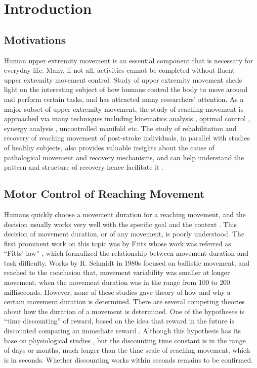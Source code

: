\chapter{Introduction}
\raggedbottom
\label{cha:introduction}


\section{Motivations}
\label{sec:motivations}
Human upper extremity movement is an essential component that is necessary for everyday life.
Many, if not all, activities cannot be completed without fluent upper extremity movement control.
Study of upper extremity movement sheds light on the interesting subject of how humans control the body to move around and perform certain tasks, and has attracted many researchers’ attention. 
As a major subset of upper extremity movement, the study of reaching movement is approached via many techniques including kinematics analysis \cite{Hogan2009}, optimal control \cite{Todorov2002}, synergy analysis \cite{Bockemuehl2010}, uncontrolled manifold \cite{Domkin2005} etc. 
The study of rehabilitation and recovery of reaching movement of post-stroke individuals, in parallel with studies of healthy subjects, also provides valuable insights about the cause of pathological movement and recovery mechanisms, and can help understand the pattern and structure of recovery hence facilitate it \cite{Liebermann2012}.

\section{Motor Control of Reaching Movement}
Humans quickly choose a movement duration for a reaching movement, and the decision usually works very well with the specific goal and the context \cite{Tanaka2006}. 
This decision of movement duration, or of any movement, is poorly understood. 
The first prominent work on this topic was by Fitts whose work was referred as “Fitts’ law” \cite{Fitts1954}, which formulized the relationship between movement duration and task difficulty. 
Works by R. Schmidt in 1980s \cite{Urbin2011} focused on ballistic movement, and reached to the conclusion that, movement variability was smaller at longer movement, when the movement duration was in the range from 100 to 200 milliseconds. 
However, none of these studies gave theory of how and why a certain movement duration is determined. 
There are several competing theories about how the duration of a movement is determined. 
One of the hypotheses is “time discounting” of reward, based on the idea that reward in the future is discounted comparing an immediate reward \cite{Shadmehr2010}.
Although this hypothesis has its base on physiological studies \cite{Johnson2002}, but the discounting time constant is in the range of days or months, much longer than the time scale of reaching movement, which is in seconds. 
Whether discounting works within seconds remains to be confirmed. 

